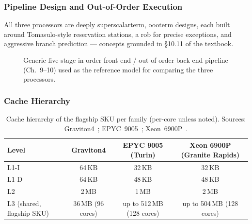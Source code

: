 \documentclass[12pt,a4paper]{article}
\begin{document}
\subsubsection*{Pipeline Design and Out-of-Order Execution}
All three processors are deeply \gls{superscalarterm},
\gls{oooterm} designs, each built around
Tomasulo-style reservation stations, a \gls{rob}
for precise exceptions, and aggressive branch prediction --- concepts
grounded in \S10.11 of the textbook.

\begin{figure}[h!]
\centering
{}
\caption{Generic five-stage in-order front-end / out-of-order back-end
pipeline (Ch.~9--10) used as the reference model for comparing the three
processors.}
\label{fig:pipeline}
\end{figure}

\subsubsection*{Cache Hierarchy}
\begin{table}[h!]
\centering\small
\renewcommand{\arraystretch}{1.3}
\begin{tabular}{lccc}
\toprule
Level & Graviton4 & EPYC 9005 (Turin) & Xeon 6900P (Granite Rapids) \\
\midrule
L1-I & 64\,KB & 32\,KB & 32\,KB \\
L1-D & 64\,KB & 48\,KB & 48\,KB \\
L2   & 2\,MB  & 1\,MB  & 2\,MB  \\
L3 (shared, flagship SKU) & 36\,MB (96 cores) &
  up to 512\,MB (128 cores) & up to 504\,MB (128 cores) \\
\bottomrule
\end{tabular}
\caption{Cache hierarchy of the flagship SKU per family (per-core
unless noted). Sources:
Graviton4~\cite{chipsandcheese_graviton4}; EPYC~9005~\cite{amdepyc,hothardware_turin};
Xeon~6900P~\cite{intelxeon,hothardware_xeon6}.}
\label{tab:cache}
\end{table}
\end{document}
